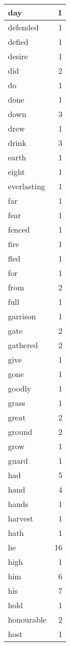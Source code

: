 \begin{center}
\begin{longtable}{l|r}
day & 1 \\ \hline
defended & 1 \\ \hline
defied & 1 \\ \hline
desire & 1 \\ \hline
did & 2 \\ \hline
do & 1 \\ \hline
done & 1 \\ \hline
down & 3 \\ \hline
drew & 1 \\ \hline
drink & 3 \\ \hline
earth & 1 \\ \hline
eight & 1 \\ \hline
everlasting & 1 \\ \hline
far & 1 \\ \hline
fear & 1 \\ \hline
fenced & 1 \\ \hline
fire & 1 \\ \hline
fled & 1 \\ \hline
for & 1 \\ \hline
from & 2 \\ \hline
full & 1 \\ \hline
garrison & 1 \\ \hline
gate & 2 \\ \hline
gathered & 2 \\ \hline
give & 1 \\ \hline
gone & 1 \\ \hline
goodly & 1 \\ \hline
grass & 1 \\ \hline
great & 2 \\ \hline
ground & 2 \\ \hline
grow & 1 \\ \hline
guard & 1 \\ \hline
had & 5 \\ \hline
hand & 4 \\ \hline
hands & 1 \\ \hline
harvest & 1 \\ \hline
hath & 1 \\ \hline
he & 16 \\ \hline
high & 1 \\ \hline
him & 6 \\ \hline
his & 7 \\ \hline
hold & 1 \\ \hline
honourable & 2 \\ \hline
host & 1 \\ \hline

\end{longtable}
\end{center}
